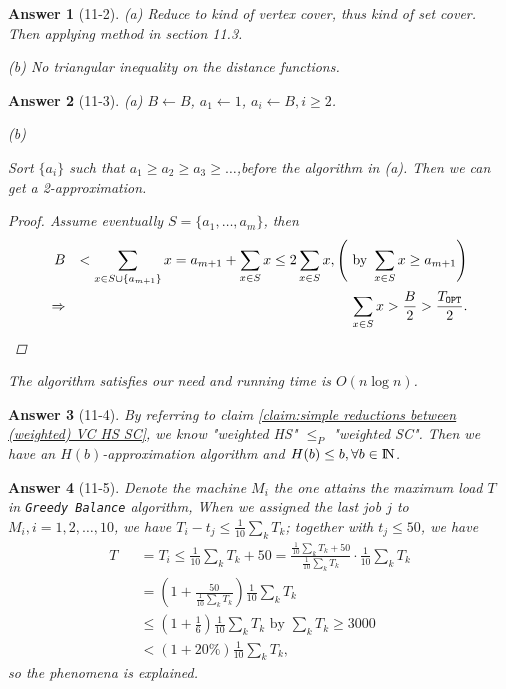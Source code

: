 \documentclass[11pt]{article}
\newcommand {\Naturals}  {{\rm I \! N}}
\theoremstyle{numberplain}
\theoremstyle{nonumberplain}
\newtheorem{proof}{Proof}
\newtheorem{ans}{Answer}
\newcommand{\0}{{\mathbf{0}}}
\begin{document}
\begin{ans}[11-2] (a) Reduce to kind of vertex cover, thus kind of set cover. Then applying method in section 11.3.


(b) No triangular inequality on the distance functions.
\end{ans}
\begin{ans}[11-3] (a) $B\leftarrow B$, $a_1\leftarrow 1$, $a_i\leftarrow B,i\geq 2$. 

(b) 
\begin{claim}
Sort $\{a_i\}$ such that $a_1\geq a_2\geq a_3\geq \ldots$,before the algorithm in (a). Then we can get a 2-approximation.
\end{claim}
\begin{proof}
Assume eventually $S=\{a_1,\ldots,a_m\}$, then 
\begin{eqnarray*}
B &&<\sum_{x\in S\cup \{a_{m+1}\}}x = a_{m+1}+ \sum_{x\in S}x \leq 2\sum_{x\in S}x,\left(\text{ by } \sum_{x\in S}x  \geq a_{m+1} \right) \\
 \Rightarrow && \sum_{x\in S}x >\frac{B}{2}> \frac{T_{\tt OPT}}{2}.
\end{eqnarray*}
\end{proof}
The algorithm satisfies our need and running time is $O(n\log n)$.
\end{ans}

\begin{ans}[11-4] 
\label{ans:approximation algorithm for Hitting set problem}
By referring to claim \ref{claim:simple reductions between (weighted) VC HS SC}, we know "weighted HS" $\leq_P$ "weighted SC". Then we have an $H(b)$-approximation algorithm and $H(b)\leq b,\forall b\in \Naturals$.
\end{ans}

\begin{ans}[11-5] Denote the machine $M_i$ the one attains the maximum load $T$ in {\tt Greedy Balance} algorithm, 
When we assigned the last job $j$ to $M_i,i=1,2,\ldots, 10$,  we have 
$T_i-t_j\leq \frac{1}{10}\sum_{k}T_k$; together with $t_j\leq 50$, we have
\begin{eqnarray*}
T&& =T_i\leq \frac{1}{10}\sum_{k}T_k + 50=\frac{\frac{1}{10}\sum_{k}T_k + 50}{\frac{1}{10}\sum_{k}T_k}\cdot \frac{1}{10}\sum_{k}T_k \\
&& =\left(1 +\frac{50}{\frac{1}{10}\sum_{k}T_k}\right)\frac{1}{10}\sum_{k}T_k \\
&&\leq \left(1 +\frac16\right)\frac{1}{10}\sum_{k}T_k \text{ by } \sum_{k}T_k\geq 3000 \\
&& <\left(1 +20\%\right)\frac{1}{10}\sum_{k}T_k,
\end{eqnarray*}
so the phenomena is explained.
\end{ans}
\end{document}
